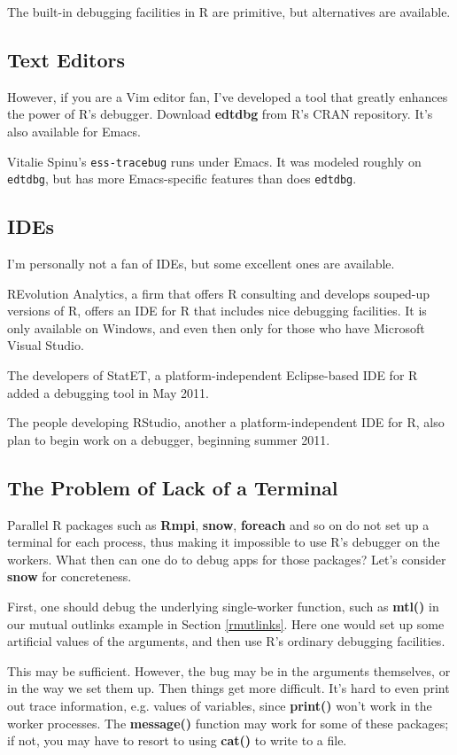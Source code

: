 The built-in debugging facilities in R are primitive, but alternatives
are available.

\subsection{Text Editors}

However, if you are a Vim editor fan, I've developed a tool that greatly
enhances the power of R's debugger.  Download {\bf edtdbg} from R's CRAN
repository.  It's also available for Emacs.

Vitalie Spinu's {\tt ess-tracebug} runs under Emacs.  It was modeled
roughly on {\tt edtdbg}, but has more Emacs-specific features
than does {\tt edtdbg}.

\subsection{IDEs}

I'm personally not a fan of IDEs, but some excellent ones are available.

REvolution Analytics, a firm that offers R consulting and develops
souped-up versions of R, offers an IDE for R that includes nice
debugging facilities.  It is only available on Windows, and even then
only for those who have Microsoft Visual Studio.

The developers of StatET, a platform-independent Eclipse-based IDE for
R added a debugging tool in May 2011.

The people developing RStudio, another  a platform-independent IDE for
R, also plan to begin work on a debugger, beginning summer 2011.

\subsection{The Problem of Lack of a Terminal}

Parallel R packages such as {\bf Rmpi}, {\bf snow}, {\bf foreach} and so
on do not set up a terminal for each process, thus making it impossible
to use R's debugger on the workers.  What then can one do to debug apps
for those packages?  Let's consider {\bf snow} for concreteness.

First, one should debug the underlying single-worker function, such as {\bf
mtl()} in our mutual outlinks example in Section \ref{rmutlinks}.  Here
one would set up some artificial values of the arguments, and then use
R's ordinary debugging facilities.

This may be sufficient.  However, the bug may be in the arguments
themselves, or in the way we set them up.  Then things get more
difficult.  It's hard to even print out trace information, e.g. values
of variables, since {\bf print()} won't work in the worker processes.
The {\bf message()} function may work for some of these packages; if
not, you may have to resort to using {\bf cat()} to write to a file.

